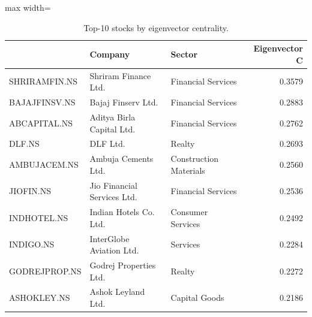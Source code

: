 \begin{table}
\centering
\caption{Top-10 stocks by eigenvector centrality.}
\label{tab:top10_eigenvector}
\begin{adjustbox}{max width=\textwidth}
\begin{tabular}{lllr}
\toprule
 & Company & Sector & Eigenvector C \\
\midrule
SHRIRAMFIN.NS & Shriram Finance Ltd. & Financial Services & 0.3579 \\
BAJAJFINSV.NS & Bajaj Finserv Ltd. & Financial Services & 0.2883 \\
ABCAPITAL.NS & Aditya Birla Capital Ltd. & Financial Services & 0.2762 \\
DLF.NS & DLF Ltd. & Realty & 0.2693 \\
AMBUJACEM.NS & Ambuja Cements Ltd. & Construction Materials & 0.2560 \\
JIOFIN.NS & Jio Financial Services Ltd. & Financial Services & 0.2536 \\
INDHOTEL.NS & Indian Hotels Co. Ltd. & Consumer Services & 0.2492 \\
INDIGO.NS & InterGlobe Aviation Ltd. & Services & 0.2284 \\
GODREJPROP.NS & Godrej Properties Ltd. & Realty & 0.2272 \\
ASHOKLEY.NS & Ashok Leyland Ltd. & Capital Goods & 0.2186 \\
\bottomrule
\end{tabular}
\end{adjustbox}
\end{table}
